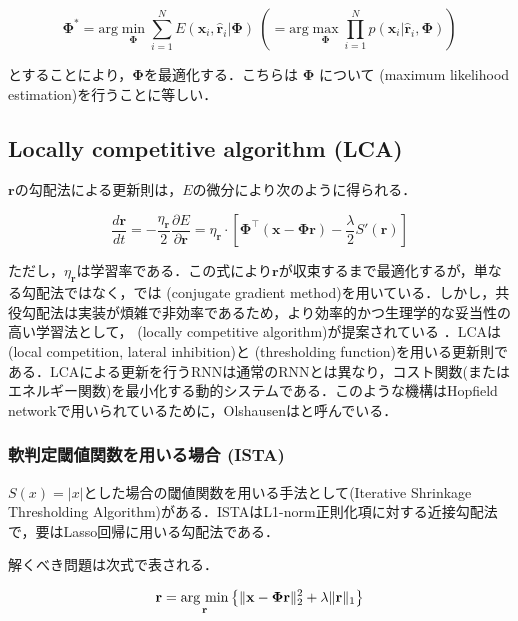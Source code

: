 \begin{equation}
\mathbf{\Phi}^*=\text{arg}\min_{\mathbf{\Phi}} \sum_{i=1}^N E(\mathbf{x}_i, \hat{\mathbf{r}}_i|\mathbf{\Phi})\ \left(= \text{arg}\max_{\mathbf{\Phi}} \prod_{i=1}^N p(\mathbf{x}_i|\hat{\mathbf{r}}_i, \mathbf{\Phi})\right)
\end{equation}


とすることにより，$\mathbf{\Phi}$を最適化する．こちらは $\mathbf{\Phi}$ について \textbf{} (maximum likelihood estimation)を行うことに等しい．
\subsection{ Locally competitive algorithm (LCA) }
$\mathbf{r}$の勾配法による更新則は，$E$の微分により次のように得られる．


\begin{equation}
\frac{d \mathbf{r}}{dt}= -\frac{\eta_\mathbf{r}}{2}\frac{\partial E}{\partial \mathbf{r}}=\eta_\mathbf{r} \cdot\left[\mathbf{\Phi}^\top (\mathbf{x}-\mathbf{\Phi}\mathbf{r})- \frac{\lambda}{2}S'\left(\mathbf{r}\right)\right]
\end{equation}


ただし，$\eta_{\mathbf{r}}$は学習率である．この式により$\mathbf{r}$が収束するまで最適化するが，単なる勾配法ではなく，\cite{Olshausen1996-xe}では\textbf{} (conjugate gradient method)を用いている．しかし，共役勾配法は実装が煩雑で非効率であるため，より効率的かつ生理学的な妥当性の高い学習法として，\textbf{}  (locally competitive algorithm)が提案されている \cite{Rozell2008-wp}．LCAは\textbf{} (local competition, lateral inhibition)と\textbf{} (thresholding function)を用いる更新則である．LCAによる更新を行うRNNは通常のRNNとは異なり，コスト関数(またはエネルギー関数)を最小化する動的システムである．このような機構はHopfield networkで用いられているために，Olshausenは\textbf{}と呼んでいる．
\subsubsection{軟判定閾値関数を用いる場合 (ISTA)}
$S(x)=|x|$とした場合の閾値関数を用いる手法として\textbf{}(Iterative Shrinkage Thresholding Algorithm)がある．ISTAはL1-norm正則化項に対する近接勾配法で，要はLasso回帰に用いる勾配法である．

解くべき問題は次式で表される．


\begin{equation}
\mathbf{r} = \mathop{\rm arg~min}\limits_{\mathbf{r}}\left\{\|\mathbf{x}-\mathbf{\Phi}\mathbf{r}\|^2_2+\lambda\|\mathbf{r}\|_1\right\}
\end{equation}


